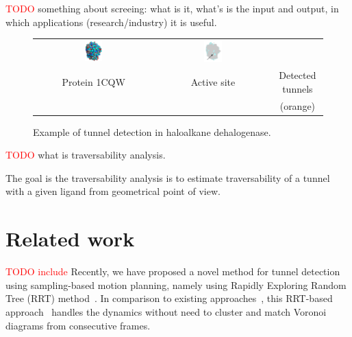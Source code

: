 \documentclass{llncs}
\newcommand{\red}[1]{\textcolor{red}{#1}}
\begin{document}
\red{TODO}
something about screeing: what is it, what's is the input and output, in which applications (research/industry) it is useful.



\begin{figure}[t]
\centering
{\footnotesize
\renewcommand{\arraystretch}{0.1}
\renewcommand{\tabcolsep}{0pt}
\begin{tabular}{ccc}
\includegraphics[width=0.15\textwidth]{fig/motiv1} &
\includegraphics[width=0.17\textwidth]{fig/motiv2lab} \\
Protein 1CQW & Active site & Detected tunnels \\
             &            & (orange)
\end{tabular}
}
\caption{\label{fig::motiv}
    Example of tunnel detection in haloalkane dehalogenase.
}
\end{figure}

\red{TODO}
what is traversability analysis.

The goal is the traversability analysis is to estimate traversability of a tunnel with a given ligand from geometrical point of view.




\section{Related work}

\red{TODO include}
Recently, we have proposed a novel method for tunnel detection using sampling-based motion planning, namely using Rapidly Exploring Random Tree (RRT) method~\cite{vonasek2016application}.
In comparison to existing approaches~\cite{Petrek20071357,citeulike:6257975}, this RRT-based approach~\cite{vonasek2016application} 
handles the dynamics without need to cluster and match Voronoi diagrams from consecutive frames.
\end{document}

